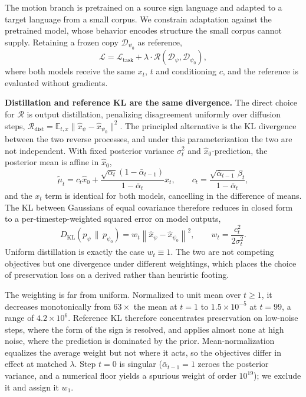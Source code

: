 \documentclass{article}
\begin{document}
The motion branch is pretrained on a source sign language and adapted to a target
language from a small corpus. We constrain adaptation against the pretrained
model, whose behavior encodes structure the small corpus cannot supply. Retaining
a frozen copy $\mathcal{D}_{\psi_0}$ as reference,
\begin{equation}
    \mathcal{L} = \mathcal{L}_{\text{task}}
    + \lambda \cdot \mathcal{R}( \mathcal{D}_{\psi}, \mathcal{D}_{\psi_0} ),
\end{equation}
where both models receive the same $x_t$, $t$ and conditioning $c$, and the
reference is evaluated without gradients.

\noindent\textbf{Distillation and reference KL are the same divergence.} The
direct choice for $\mathcal{R}$ is output distillation, penalizing disagreement
uniformly over diffusion steps, $\mathcal{R}_{\text{dist}} = \mathbb{E}_{t,x}
\|\hat{x}_{\psi} - \hat{x}_{\psi_0}\|^2$. The principled alternative is the KL
divergence between the two reverse processes, and under this parameterization the
two are not independent. With fixed posterior variance $\sigma_t^2$ and
$\hat{x}_0$-prediction, the posterior mean is affine in $\hat{x}_0$,
\begin{equation}
    \tilde{\mu}_t = c_t \hat{x}_0
    + \frac{\sqrt{\alpha_t}(1-\bar{\alpha}_{t-1})}{1-\bar{\alpha}_t} x_t,
    \qquad
    c_t = \frac{\sqrt{\bar{\alpha}_{t-1}}\,\beta_t}{1-\bar{\alpha}_t},
\end{equation}
and the $x_t$ term is identical for both models, cancelling in the difference of
means. The KL between Gaussians of equal covariance therefore reduces in closed
form to a per-timestep-weighted squared error on model outputs,
\begin{equation}
    D_{\mathrm{KL}} \left( p_{\psi} \,\|\, p_{\psi_0} \right)
    = w_t \left\| \hat{x}_{\psi} - \hat{x}_{\psi_0} \right\|^2,
    \qquad
    w_t = \frac{c_t^2}{2\sigma_t^2}.
\end{equation}
Uniform distillation is exactly the case $w_t \equiv 1$. The two are not
competing objectives but one divergence under different weightings, which places
the choice of preservation loss on a derived rather than heuristic footing.

The weighting is far from uniform. Normalized to unit mean over $t \geq 1$, it
decreases monotonically from $63\times$ the mean at $t=1$ to $1.5 \times 10^{-5}$
at $t=99$, a range of $4.2 \times 10^{6}$. Reference KL therefore concentrates
preservation on low-noise steps, where the form of the sign is resolved, and
applies almost none at high noise, where the prediction is dominated by the
prior. Mean-normalization equalizes the average weight but not where it acts, so
the objectives differ in effect at matched $\lambda$. Step $t=0$ is singular
($\bar{\alpha}_{t-1}=1$ zeroes the posterior variance, and a numerical floor
yields a spurious weight of order $10^{19}$); we exclude it and assign it $w_1$.
\end{document}
